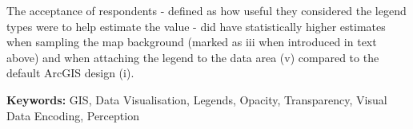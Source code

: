 {\vspace{0.4cm}

\noindent The acceptance of respondents - defined as how useful they considered the legend types were to help estimate the value - did have statistically higher estimates when sampling the map background (marked as iii when introduced in text above) and when attaching the legend to the data area (v) compared to the default ArcGIS design (i). 

\vspace{0.4cm}

\noindent \textbf{Keywords:} GIS, Data Visualisation, Legends, Opacity, Transparency, Visual Data Encoding, Perception
}

% 

